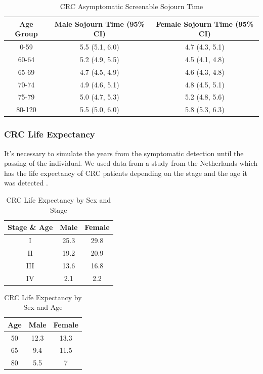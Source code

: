 \begin{table}[H]
\caption{CRC Asymptomatic Screenable Sojourn Time}
\centering
\begin{tabular}{|c|c|c|}
\hline
Age Group & Male Sojourn Time (95\% CI) & Female Sojourn Time (95\% CI) \\ \hline
0-59   & 5.5 (5.1, 6.0) & 4.7 (4.3, 5.1)\\ \hline
60-64  & 5.2 (4.9, 5.5) & 4.5 (4.1, 4.8)\\ \hline
65-69  & 4.7 (4.5, 4.9) & 4.6 (4.3, 4.8)\\ \hline
70-74  & 4.9 (4.6, 5.1) & 4.8 (4.5, 5.1)\\ \hline
75-79  & 5.0 (4.7, 5.3) & 5.2 (4.8, 5.6)\\ \hline
80-120 & 5.5 (5.0, 6.0) & 5.8 (5.3, 6.3)\\ \hline
\end{tabular}
\label{table:asymptomatic_sojourn_time}
\end{table}

\subsubsection*{CRC Life Expectancy}

It's necessary to simulate the years from the symptomatic detection until the passing of the individual. We used data from a study from the Netherlands which has the life expectancy of CRC patients depending on the stage and the age it was detected \cite{soerjomataram_most_2012}. 

\begin{table}[H]
\caption{CRC Life Expectancy by Sex and Stage}
\centering
\begin{tabular}{|c|c|c|}
\hline
Stage \& Age & Male & Female\\ \hline
I   & 25.3 & 29.8 \\ \hline
II  & 19.2 & 20.9 \\ \hline
III & 13.6 & 16.8 \\ \hline
IV  & 2.1  & 2.2  \\ \hline
\end{tabular}
\label{table:crc_life_expectancy_by_stage}
\end{table}

\begin{table}[H]
\caption{CRC Life Expectancy by Sex and Age}
\centering
\begin{tabular}{|c|c|c|}
\hline
Age & Male & Female\\ \hline
50  & 12.3 & 13.3 \\ \hline
65  & 9.4  & 11.5 \\ \hline
80  & 5.5  & 7    \\ \hline
\end{tabular}
\label{table:crc_life_expectancy_by_age}
\end{table}

